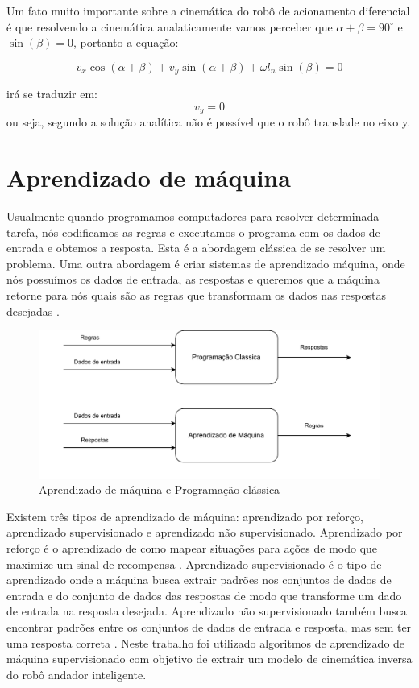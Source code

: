 Um fato muito importante sobre a cinemática do robô de acionamento diferencial
é que resolvendo a cinemática analaticamente vamos perceber que
$\alpha + \beta = 90^{\circ}$ e $\sin(\beta) = 0$, portanto a equação:

\begin{equation}
    v_x\cos(\alpha + \beta)  + v_y\sin(\alpha + \beta) +  \omega l_n\sin(\beta) = 0
\end{equation}

irá se traduzir em:
\begin{equation}
    v_y = 0
\end{equation}
ou seja, segundo a solução analítica não é possível que
o robô translade no eixo y.

\section{Aprendizado de máquina}
Usualmente quando programamos computadores para
resolver determinada tarefa, nós codificamos as regras e
executamos o programa com os dados de entrada e obtemos a resposta.
Esta é a abordagem clássica de se resolver um problema. Uma outra abordagem
é criar sistemas de aprendizado máquina, onde nós possuímos os
dados de entrada, as respostas e queremos que a máquina retorne
para nós quais são as regras que transformam os dados nas respostas
desejadas \cite{chollet2021deep}.

\begin{figure}[H]
    \centering
    \includegraphics[scale=0.7]{figuras/machine_learning_diagram.pdf}
    \caption{Aprendizado de máquina e Programação clássica}
\end{figure}

Existem três tipos de aprendizado de máquina: aprendizado por reforço,
aprendizado supervisionado e aprendizado não supervisionado.
Aprendizado por reforço é o aprendizado de como mapear situações
para ações de modo que maximize um sinal de recompensa
\cite{sutton2018reinforcement}. Aprendizado supervisionado é o
tipo de aprendizado onde a máquina busca extrair padrões nos conjuntos
de dados de entrada  e do conjunto de dados das respostas de modo que
transforme um dado de entrada na resposta desejada. Aprendizado não
supervisionado também busca encontrar padrões entre os conjuntos de
dados de entrada e resposta, mas sem ter uma resposta correta
\cite{trask2019grokking}. Neste trabalho foi utilizado algoritmos de
aprendizado de máquina supervisionado com objetivo de extrair um modelo de
cinemática inversa do robô andador inteligente.

